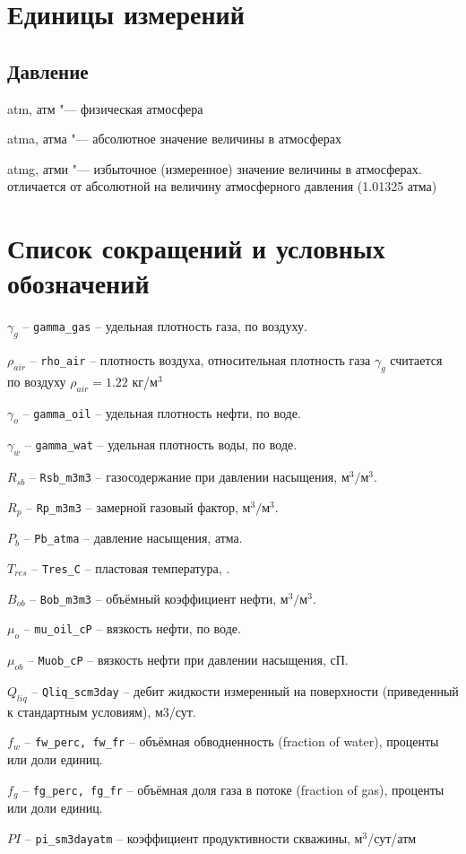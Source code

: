 \chapter*{Единицы измерений} %
\noindent

\section*{Давление}
 
 atm, атм "--- физическая атмосфера 
 
 atma, атма "--- абсолютное значение величины в атмосферах
 
 atmg, атми "--- избыточное (измеренное) значение величины в атмосферах. отличается от абсолютной на величину атмосферного давления (1.01325 атма)

\chapter*{Список сокращений и условных обозначений} %
\noindent

$\gamma_g$  -- \texttt{gamma_gas} -- удельная плотность газа, по воздуху. 

$\rho_{air}$ -- \texttt{rho_air} -- плотность воздуха, относительная плотность газа $\gamma_g$ считается по воздуху $\rho_{air} = 1.22$ кг/$\text{м}^3$

$\gamma_o$  -- \texttt{gamma_oil} -- удельная плотность нефти, по воде.

$\gamma_w$  -- \texttt{gamma_wat} -- удельная плотность воды, по воде. 

$R_{sb}$ -- \texttt{Rsb_m3m3} -- газосодержание при давлении насыщения,  $\text{м}^3/\text{м}^3$. 

$R_p$ -- \texttt{Rp_m3m3} -- замерной газовый фактор, $\text{м}^3/\text{м}^3$.

$P_b$ -- \texttt{Pb_atma} -- давление насыщения, атма.  

$T_{res}$ -- \texttt{Tres_C} -- пластовая температура, \textcelsius. 

$B_{ob}$ -- \texttt{Bob_m3m3} -- объёмный коэффициент нефти,  $\text{м}^3/\text{м}^3$. 

\(\mu_{o}\) -- \texttt{mu_oil_cP} -- вязкость нефти, по воде.

$\mu_{ob}$ -- \texttt{Muob_cP} -- вязкость нефти при давлении насыщения, сП. 

$Q_{liq}$ -- \texttt{Qliq_scm3day} -- дебит жидкости измеренный на поверхности (приведенный к стандартным условиям), м3/сут. 

$f_{w}$ -- \texttt{fw_perc, fw_fr} -- объёмная обводненность (fraction of water), проценты или доли единиц. 

$f_{g}$ -- \texttt{fg_perc, fg_fr} -- объёмная доля газа в потоке (fraction of gas), проценты или доли единиц. 

$PI$ -- \texttt{pi_sm3dayatm} -- коэффициент продуктивности скважины, $\text{м}^3$/сут/атм
